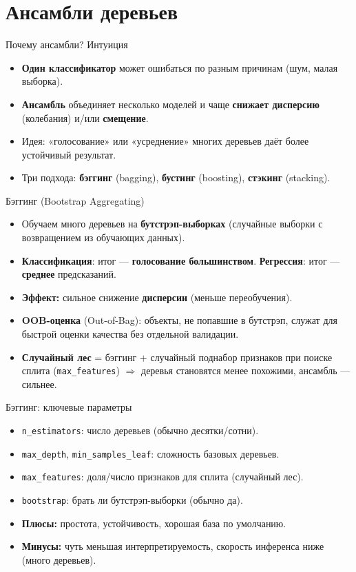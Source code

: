 \documentclass[12pt]{beamer}
\begin{document}
\section{Ансамбли деревьев}

\begin{frame}{Почему ансамбли? Интуиция}
	\begin{itemize}
		\item \textbf{Один классификатор} может ошибаться по разным причинам (шум, малая выборка).
		\item \textbf{Ансамбль} объединяет несколько моделей и чаще \textbf{снижает дисперсию} (колебания) и/или \textbf{смещение}.
		\item Идея: «голосование» или «усреднение» многих деревьев даёт более устойчивый результат.
		\item Три подхода: \textbf{бэггинг} (bagging), \textbf{бустинг} (boosting), \textbf{стэкинг} (stacking).
	\end{itemize}
\end{frame}

\begin{frame}{Бэггинг (Bootstrap Aggregating)}
	\begin{itemize}
		\item Обучаем много деревьев на \textbf{бутстрэп-выборках} (случайные выборки с возвращением из обучающих данных).
		\item \textbf{Классификация}: итог — \textbf{голосование большинством}. \quad
		      \textbf{Регрессия}: итог — \textbf{среднее} предсказаний.
		\item \textbf{Эффект:} сильное снижение \textbf{дисперсии} (меньше переобучения).
		\item \textbf{OOB-оценка} (Out-of-Bag): объекты, не попавшие в бутстрэп, служат для быстрой оценки качества без отдельной валидации.
		\item \textbf{Случайный лес} = бэггинг $+$ случайный поднабор признаков при поиске сплита (\texttt{max\_features}) $\Rightarrow$ деревья становятся менее похожими, ансамбль — сильнее.
	\end{itemize}
\end{frame}

\begin{frame}{Бэггинг: ключевые параметры}
	\begin{itemize}
		\item \texttt{n\_estimators}: число деревьев (обычно десятки/сотни).
		\item \texttt{max\_depth}, \texttt{min\_samples\_leaf}: сложность базовых деревьев.
		\item \texttt{max\_features}: доля/число признаков для сплита (случайный лес).
		\item \texttt{bootstrap}: брать ли бутстрэп-выборки (обычно да).
		\item \textbf{Плюсы:} простота, устойчивость, хорошая база по умолчанию.
		\item \textbf{Минусы:} чуть меньшая интерпретируемость, скорость инференса ниже (много деревьев).
	\end{itemize}
\end{frame}
\end{document}
